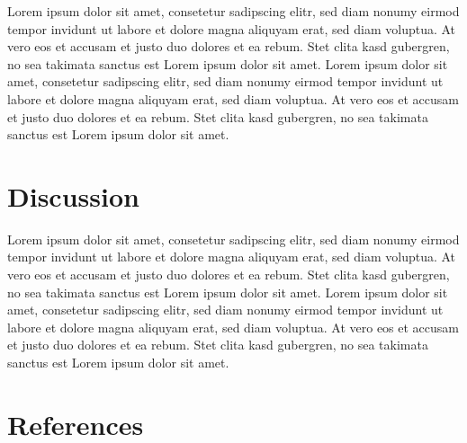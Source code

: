 \documentclass[
  english,
  man,floatsintext]{apa6}
\begin{document}
Lorem ipsum dolor sit amet, consetetur sadipscing elitr, sed diam nonumy eirmod tempor invidunt ut labore et dolore magna aliquyam erat, sed diam voluptua. At vero eos et accusam et justo duo dolores et ea rebum. Stet clita kasd gubergren, no sea takimata sanctus est Lorem ipsum dolor sit amet. Lorem ipsum dolor sit amet, consetetur sadipscing elitr, sed diam nonumy eirmod tempor invidunt ut labore et dolore magna aliquyam erat, sed diam voluptua. At vero eos et accusam et justo duo dolores et ea rebum. Stet clita kasd gubergren, no sea takimata sanctus est Lorem ipsum dolor sit amet.

\hypertarget{discussion}{%
\section{Discussion}\label{discussion}}

Lorem ipsum dolor sit amet, consetetur sadipscing elitr, sed diam nonumy eirmod tempor invidunt ut labore et dolore magna aliquyam erat, sed diam voluptua. At vero eos et accusam et justo duo dolores et ea rebum. Stet clita kasd gubergren, no sea takimata sanctus est Lorem ipsum dolor sit amet. Lorem ipsum dolor sit amet, consetetur sadipscing elitr, sed diam nonumy eirmod tempor invidunt ut labore et dolore magna aliquyam erat, sed diam voluptua. At vero eos et accusam et justo duo dolores et ea rebum. Stet clita kasd gubergren, no sea takimata sanctus est Lorem ipsum dolor sit amet.

\newpage

\hypertarget{references}{%
\section{References}\label{references}}

\begingroup
\setlength{\parindent}{-0.5in}
\setlength{\leftskip}{0.5in}
\end{document}

